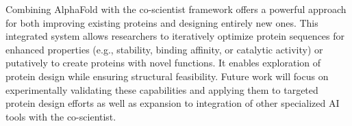 Combining AlphaFold with the co-scientist framework offers a powerful approach for both improving existing proteins and designing entirely new ones. This integrated system allows researchers to iteratively optimize protein sequences for enhanced properties (e.g., stability, binding affinity, or catalytic activity) or putatively to create proteins with novel functions. It enables exploration of protein design while ensuring structural feasibility. Future work will focus on experimentally validating these capabilities and applying them to targeted protein design efforts as well as expansion to integration of other specialized AI tools with the co-scientist.

\newpage
\setlength\bibitemsep{3pt}
\printbibliography
\balance
\clearpage

